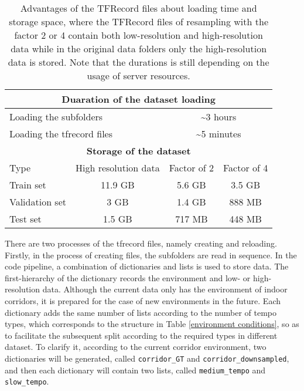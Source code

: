 \begin{table}
    \centering
    \caption{Advantages of the TFRecord files about loading time and storage space, where the TFRecord files of resampling with the factor 2 or 4 contain both low-resolution and high-resolution data while in the original data folders only the high-resolution data is stored. Note that the durations is still depending on the usage of server resources.}
    \label{advantages of the tfrecord files}
    \begin{tabular}{cccc}
        \hline
        \multicolumn{4}{c}{\textbf{Duaration of the dataset loading}}\\
        \hline
        \multicolumn{2}{l|}{Loading the subfolders} & \multicolumn{2}{c}{\textasciitilde 3 hours}\\
        \hline
        \multicolumn{2}{l|}{Loading the \gls{tfrecord} files} & \multicolumn{2}{c}{\textasciitilde 5 minutes}\\
        \hline
        \multicolumn{4}{c}{\textbf{Storage of the dataset}}\\
        \hline
        \multicolumn{1}{l|}{Type} & \multicolumn{1}{c|}{High resolution data} & \multicolumn{1}{c|}{Factor of 2} & \multicolumn{1}{c}{Factor of 4}\\
        \hline
        \multicolumn{1}{l|}{Train set} & \multicolumn{1}{c|}{11.9 GB} & \multicolumn{1}{c|}{5.6 GB} & \multicolumn{1}{c}{3.5 GB}\\
        \hline
        \multicolumn{1}{l|}{Validation set} & \multicolumn{1}{c|}{3 GB} & \multicolumn{1}{c|}{1.4 GB} & \multicolumn{1}{c}{888 MB}\\
        \hline
        \multicolumn{1}{l|}{Test set} & \multicolumn{1}{c|}{1.5 GB} & \multicolumn{1}{c|}{717 MB} & \multicolumn{1}{c}{448 MB}\\
        \hline
    \end{tabular}
\end{table}

There are two processes of the \gls{tfrecord} files, namely creating and reloading. Firstly, in the process of creating files, the subfolders are read in sequence. In the code pipeline, a combination of dictionaries and lists is used to store data. The first-hierarchy of the dictionary records the environment and low- or high-resolution data. Although the current data only has the environment of indoor corridors, it is prepared for the case of new environments in the future. Each dictionary adds the same number of lists according to the number of tempo types, which corresponds to the structure in Table \ref{environment conditions}, so as to facilitate the subsequent split according to the required types in different dataset. To clarify it, according to the current corridor environment, two dictionaries will be generated, called \texttt{corridor\_GT} and \texttt{corridor\_downsampled}, and then each dictionary will contain two lists, called \texttt{medium\_tempo} and \texttt{slow\_tempo}.

